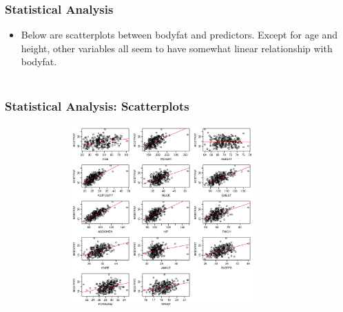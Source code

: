 \documentclass{beamer}
\begin{document}
\begin{frame}
\frametitle{Statistical Analysis}
\begin{itemize}
\item Below are scatterplots between bodyfat and predictors. Except for age and height, other variables all seem to have somewhat linear relationship with bodyfat. \\~\\
\end{itemize}
\end{frame}


\begin{frame}
\frametitle{Statistical Analysis: Scatterplots}
\begin{itemize}

\begin{figure}
\centering
\includegraphics[height=7cm,width=10cm]{Scatterplot.png}
\label{2}
\end{figure}
\end{itemize}
\end{frame}
\end{document}
